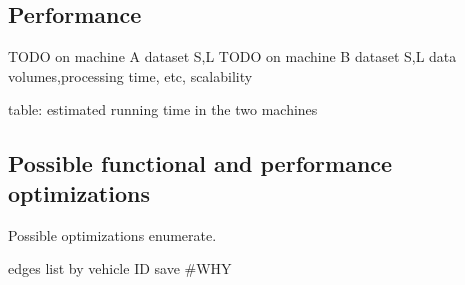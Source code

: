 \subsection{Performance}
TODO on machine A dataset S,L
TODO on machine B dataset S,L
	data volumes,processing time, etc, scalability

table: estimated running time in the two machines
\subsection{Possible functional and performance optimizations}
Possible optimizations enumerate.

edges list by vehicle ID save
\#WHY